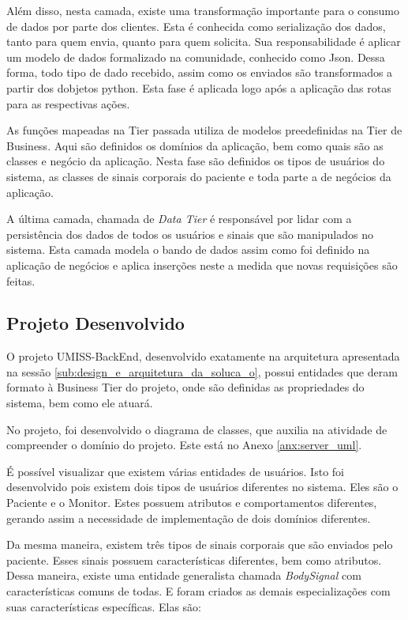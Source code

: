 Além disso, nesta camada, existe uma transformação importante para o consumo de dados por parte dos clientes.
Esta é conhecida como serialização dos dados, tanto para quem envia, quanto para quem solicita.
Sua responsabilidade é aplicar um modelo de dados formalizado na comunidade, conhecido como Json.
Dessa forma, todo tipo de dado recebido, assim como os enviados são transformados  a partir
dos dobjetos python. Esta fase é aplicada logo após a aplicação das rotas para as respectivas
ações.

As funções mapeadas na Tier passada utiliza de modelos preedefinidas na Tier de Business.
Aqui são definidos os domínios da aplicação, bem como quais são as classes e negócio da
aplicação. Nesta fase são definidos os tipos de usuários do sistema, as classes de sinais
corporais do paciente e toda parte a de negócios da aplicação.

A última camada, chamada de \textit{Data Tier} é responsável por lidar com a persistência dos dados
de todos os usuários e sinais que são manipulados no sistema. Esta camada modela o
bando de dados assim como foi definido na aplicação de negócios e aplica
inserções neste a medida que novas requisições são feitas.

\subsection{Projeto Desenvolvido}
\label{sub:projetodesenvolvido}

O projeto UMISS-BackEnd, desenvolvido exatamente na arquitetura apresentada na sessão
\ref{sub:design_e_arquitetura_da_soluca_o}, possui entidades que deram formato à Business
Tier do projeto, onde são definidas as propriedades do sistema, bem como ele atuará.

No projeto, foi desenvolvido o diagrama de classes, que auxilia na atividade de compreender
o domínio do projeto. Este está no Anexo \ref{anx:server_uml}.

É possível visualizar que existem várias entidades de usuários. Isto foi desenvolvido pois
existem dois tipos de usuários diferentes no sistema. Eles são o Paciente e o Monitor. Estes
possuem atributos e comportamentos diferentes, gerando assim a necessidade de implementação
de dois domínios diferentes.

Da mesma maneira, existem três tipos de sinais corporais que são enviados pelo paciente.
Esses sinais possuem características diferentes, bem como atributos. Dessa maneira, existe
uma entidade generalista chamada \textit{BodySignal} com características comuns de todas. E
foram criados as demais especializações com suas características  específicas. Elas são:

